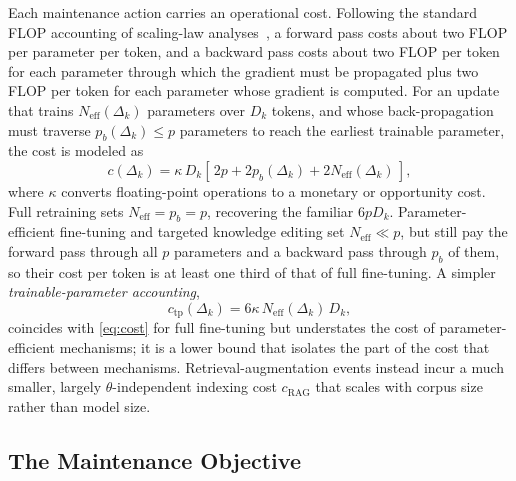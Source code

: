 \documentclass[electronics,article,submit,pdftex,moreauthors]{Definitions/mdpi}
\newcommand{\D}{\varDelta}                 %
\newcommand{\Neff}{N_{\mathrm{eff}}}
\newcommand{\cRAG}{c_{\mathrm{RAG}}}
\begin{document}
Each maintenance action carries an operational cost. Following the standard FLOP accounting of scaling-law analyses~\cite{Hoffmann2022,Kaplan2020}, a forward pass costs about two FLOP per parameter per token, and a backward pass costs about two FLOP per token for each parameter through which the gradient must be propagated plus two FLOP per token for each parameter whose gradient is computed. For an update that trains $\Neff(\D_k)$ parameters over $D_k$ tokens, and whose back-propagation must traverse $p_b(\D_k)\le p$ parameters to reach the earliest trainable parameter, the cost is modeled as
\begin{equation}\label{eq:cost}
c(\D_k)=\kappa\,D_k\left[\,2p+2p_b(\D_k)+2\Neff(\D_k)\,\right],
\end{equation}
where $\kappa$ converts floating-point operations to a monetary or opportunity cost. Full retraining sets $\Neff=p_b=p$, recovering the familiar $6pD_k$. Parameter-efficient fine-tuning and targeted knowledge editing set $\Neff\ll p$, but still pay the forward pass through all $p$ parameters and a backward pass through $p_b$ of them, so their cost per token is at least one third of that of full fine-tuning. A simpler \textit{trainable-parameter accounting},
\begin{equation}\label{eq:costtp}
c_{\mathrm{tp}}(\D_k)=6\kappa\,\Neff(\D_k)\,D_k,
\end{equation}
coincides with \eqref{eq:cost} for full fine-tuning but understates the cost of parameter-efficient mechanisms; it is a lower bound that isolates the part of the cost that differs between mechanisms. Retrieval-augmentation events instead incur a much smaller, largely $\theta$-independent indexing cost $\cRAG$ that scales with corpus size rather than model size.

\subsection{The Maintenance Objective}
\end{document}
